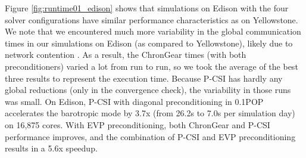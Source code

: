 Figure \ref{fig:runtime01_edison} shows that simulations on Edison
with the four solver configurations have similar performance
characteristics as on
Yellowstone. 
We note that we encountered much more variability in the global
communication times in our simulations on Edison (as compared to
Yellowstone), likely due to network contention \cite{wang2014}. As a result, the
ChronGear times (with both preconditioners) varied a lot from run to
run, so we took the average of the best three results to represent the
execution time.  Because P-CSI has hardly any global reductions
(only in the convergence check),
the variability in those runs was small. 
On Edison,  P-CSI with diagonal preconditioning in  0.1\degree\space POP
accelerates the barotropic mode by 3.7x (from 26.2s to 7.0s per simulation day) on 16,875 cores.
With EVP preconditioning, both ChronGear and P-CSI performance
improves, and the combination of P-CSI and EVP preconditioning results in a 5.6x  speedup. 
 
